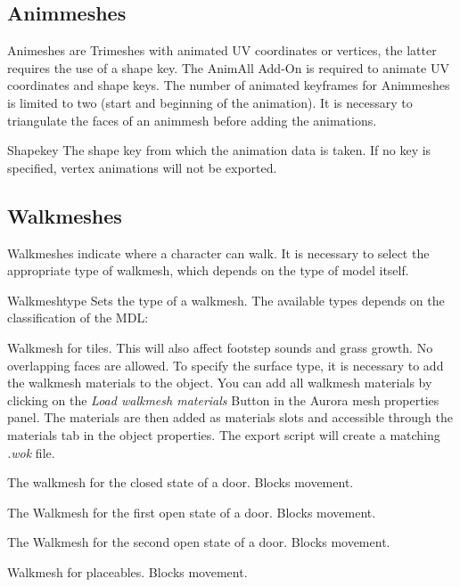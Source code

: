 \subsection{Animmeshes}
Animeshes are Trimeshes with animated UV coordinates or vertices, the latter requires the use of a 
shape key. The AnimAll Add-On is required to animate UV coordinates and shape keys. The number of 
animated keyframes for Animmeshes is limited to two (start and beginning of the animation). It is necessary 
to triangulate the faces of an animmesh before adding the animations.

\begin{propertyAurora}{Shapekey} 
    The shape key from which the animation data is taken. If no key is specified, vertex animations will
    not be exported.
\end{propertyAurora}

\subsection{Walkmeshes}
Walkmeshes indicate where a character can walk. It is necessary to select 
the appropriate type of walkmesh, which depends on the type of model itself. 

\begin{propertyAurora}{Walkmeshtype} 
Sets the type of a walkmesh. The available types depends on the classification of the MDL:
\begin{description}[leftmargin=10em,style=nextline]
    \item[Tileset] Walkmesh for tiles. This will also affect footstep sounds and grass growth. No overlapping faces are allowed. To specify the surface type, it is necessary to add the walkmesh materials to the object. You can add all walkmesh materials by clicking on the {\textit{Load walkmesh materials}} Button in the Aurora mesh properties panel. The materials are then added as materials slots and accessible through the materials tab in the object properties.
    The export script will create a matching {\textit{.wok}} file. 
    \item[Door: Closed] The walkmesh for the closed state of a door. Blocks movement.
    \item[Door: Open 1] The Walkmesh for the first open state of a door. Blocks movement.
    \item[Door: Open 2] The Walkmesh for the second open state of a door. Blocks movement.
    \item[Placeable] Walkmesh for placeables. Blocks movement.
\end{description}
\end{propertyAurora}

